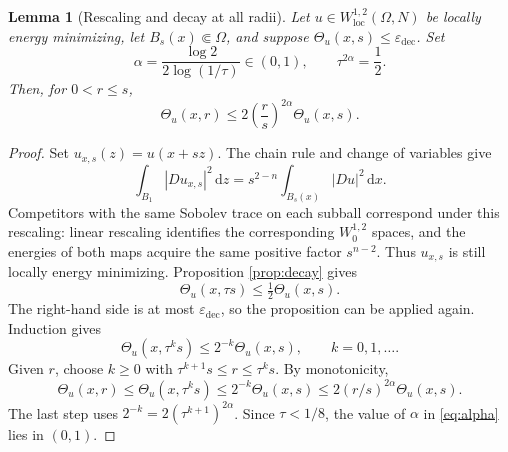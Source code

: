\documentclass[11pt,a4paper]{article}
\numberwithin{equation}{section}
\newtheorem{lemma}[theorem]{Lemma}
\theoremstyle{definition}
\newcommand{\dd}{\,\mathrm d}
\newcommand{\dx}{\dd x}
\newcommand{\W}{W^{1,2}}
\newcommand{\Wo}{W^{1,2}_0}
\newcommand{\Th}{\Theta}
\begin{document}
\begin{lemma}[Rescaling and decay at all radii]\label{lem:iteration}
Let $u\in\W_{\mathrm{loc}}(\Omega,N)$ be locally energy minimizing, let $B_s(x)\Subset\Omega$, and suppose $\Th_u(x,s)\le\varepsilon_{\mathrm{dec}}$. Set
\begin{equation}\label{eq:alpha}
\alpha=\frac{\log2}{2\log(1/\tau)}\in(0,1),
\qquad\tau^{2\alpha}=\frac12.
\end{equation}
Then, for $0<r\le s$,
\begin{equation}\label{eq:all-radii}
\Th_u(x,r)\le2\left(\frac rs\right)^{2\alpha}\Th_u(x,s).
\end{equation}
\end{lemma}
\begin{proof}
Set $u_{x,s}(z)=u(x+sz)$. The chain rule and change of variables give
\[
\int_{B_1}|Du_{x,s}|^2\dd z
=s^{2-n}\int_{B_s(x)}|Du|^2\dx.
\]
Competitors with the same Sobolev trace on each subball correspond under this rescaling: linear rescaling identifies the corresponding $\Wo$ spaces, and the energies of both maps acquire the same positive factor $s^{n-2}$. Thus $u_{x,s}$ is still locally energy minimizing. Proposition \ref{prop:decay} gives
\[
\Th_u(x,\tau s)\le\tfrac12\Th_u(x,s).
\]
The right-hand side is at most $\varepsilon_{\mathrm{dec}}$, so the proposition can be applied again. Induction gives
\[
\Th_u(x,\tau^ks)\le2^{-k}\Th_u(x,s),\qquad k=0,1,\ldots.
\]
Given $r$, choose $k\ge0$ with $\tau^{k+1}s\le r\le\tau^ks$. By monotonicity,
\[
\Th_u(x,r)\le\Th_u(x,\tau^ks)
\le2^{-k}\Th_u(x,s)
\le2(r/s)^{2\alpha}\Th_u(x,s).
\]
The last step uses $2^{-k}=2(\tau^{k+1})^{2\alpha}$. Since $\tau<1/8$, the value of $\alpha$ in \eqref{eq:alpha} lies in $(0,1)$.
\end{proof}
\end{document}
